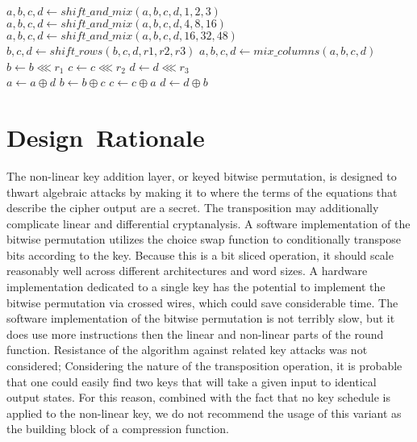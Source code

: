 \documentclass[preprint]{iacrtrans}
\begin{document}
\begin{algorithmic}
	\State $a, b, c, d \gets shift\_and\_mix(a, b, c, d, 1, 2, 3)$
	\State $a, b, c, d \gets shift\_and\_mix(a, b, c, d, 4, 8, 16)$
	\State $a, b, c, d \gets shift\_and\_mix(a, b, c, d, 16, 32, 48)$
\EndFunction\\

	\State $b, c, d \gets shift\_rows(b, c, d, r1, r2, r3)$
	\State $a, b, c, d \gets mix\_columns(a, b, c, d)$
\EndFunction\\

	\State $b\gets b \lll r_1$
	\State $c \gets c \lll r_2$
	\State $d \gets d \lll r_3$
\EndFunction\\

	\State $a \gets a \oplus d$
	\State $b \gets b \oplus c$
	\State $c \gets c \oplus a$
	\State $d \gets d \oplus b$
\EndFunction\\
\end{algorithmic}

\section{Design\ Rationale}
The non-linear key addition layer, or keyed bitwise permutation, is designed to thwart algebraic attacks by making it to where the terms of the equations that describe the cipher output are a secret. The transposition may additionally complicate linear and differential cryptanalysis. A software implementation of the bitwise permutation utilizes the choice swap function to conditionally transpose bits according to the key. Because this is a bit sliced operation, it should scale reasonably well across different architectures and word sizes. A hardware implementation dedicated to a single key has the potential to implement the bitwise permutation via crossed wires, which could save considerable time. The software implementation of the bitwise permutation is not terribly slow, but it does use more instructions then the linear and non-linear parts of the round function. Resistance of the algorithm against related key attacks was not considered; Considering the nature of the transposition operation, it is probable that one could easily find two keys that will take a given input to identical output states. For this reason, combined with the fact that no key schedule is applied to the non-linear key, we do not recommend the usage of this variant as the building block of a compression function.
\end{document}
